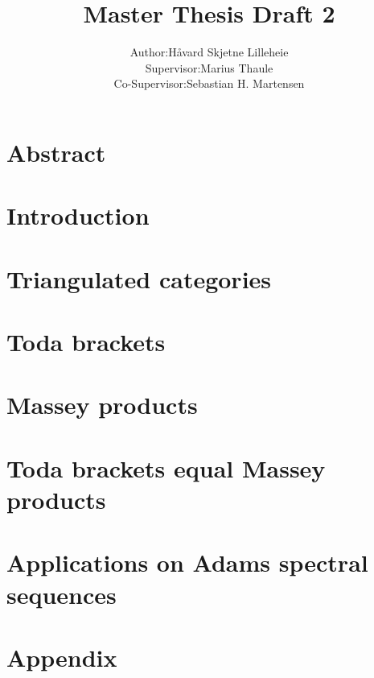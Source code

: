 \documentclass[a4paper, 10pt]{article}
\title{Master Thesis Draft 2}
\author{
    \begin{tabular}{rl}
        Author:& Håvard Skjetne Lilleheie\\
        Supervisor:& Marius Thaule\\
        Co-Supervisor:& Sebastian H. Martensen
    \end{tabular}
}
\begin{document}
\maketitle

\tableofcontents

\section*{Abstract}


\section{Introduction}


\section{Triangulated categories}
\label{section:2}


\section{Toda brackets}


\section{Massey products}
\label{section:4}


\section{Toda brackets equal Massey products}
\label{section:5}


\section{Applications on Adams spectral sequences}
\label{section:6}


\appendix
\section{Appendix}


{}

\end{document}
